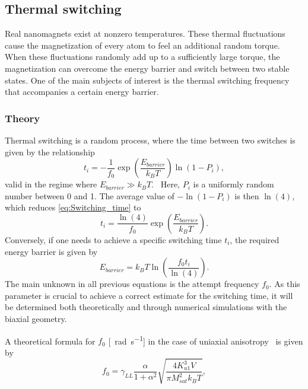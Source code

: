 \documentclass[12pt,a4paper]{article}
\begin{document}
\subsection{Thermal switching}
Real nanomagnets exist at nonzero temperatures. These thermal fluctuations cause the magnetization of every atom to feel an additional random torque. When these fluctuations randomly add up to a sufficiently large torque, the magnetization can overcome the energy barrier and switch between two stable states. One of the main subjects of interest is the thermal switching frequency that accompanies a certain energy barrier.

\subsubsection{Theory}
Thermal switching is a random process, where the time between two switches is given by the relationship
\begin{equation}
    t_i = -\frac{1}{f_0} \exp(\frac{E_{barrier}}{k_B T}) \ln(1-P_i) \mathrm{,}
    \label{eq:Switching_time}
\end{equation}
valid in the regime where $E_{barrier} \gg k_B T$.~\cite{GYP-18} Here, $P_i$ is a uniformly random number between 0 and 1. The average value of $-\ln(1-P_i)$ is then $\ln(4)$, which reduces \cref{eq:Switching_time} to
\begin{equation}
    t_i = \frac{\ln(4)}{f_0} \exp(\frac{E_{barrier}}{k_B T})  \mathrm{.}
    \label{eq:Switching_time_average}
\end{equation}
Conversely, if one needs to achieve a specific switching time $t_i$, the required energy barrier is given by
\begin{equation}
    E_{barrier} = k_B T \ln(\frac{f_0 t_i}{\ln(4)}) \mathrm{.}
\end{equation}
The main unknown in all previous equations is the attempt frequency $f_0$. As this parameter is crucial to achieve a correct estimate for the switching time, it will be determined both theoretically and through numerical simulations with the biaxial geometry. \par
A theoretical formula for $f_0$ [\SI{}{\radian\per\second}] in the case of uniaxial anisotropy~\cite{MuMax3, LEL-17b, f0_mumax3_reference} is given by
\begin{equation}
    f_0 = \gamma_{LL} \frac{\alpha}{1+\alpha^2} \sqrt{\frac{4 K_{u1}^3 V}{\pi M_{sat}^2 k_B T}} \mathrm{,}
    \label{eq:f0_theoretical_uniaxial}
\end{equation}
\end{document}
